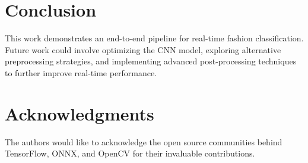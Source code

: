 \documentclass[conference]{IEEEtran}
\begin{document}
\section{Conclusion}
This work demonstrates an end-to-end pipeline for real-time fashion classification. Future work could involve optimizing the CNN model, exploring alternative preprocessing strategies, and implementing advanced post-processing techniques to further improve real-time performance.

\section*{Acknowledgments}
The authors would like to acknowledge the open source communities behind TensorFlow, ONNX, and OpenCV for their invaluable contributions.


\end{document}
